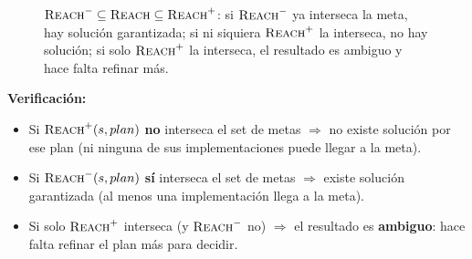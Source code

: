 \begin{figure}[H]
\centering
{}
\caption{$\textsc{Reach}^-\subseteq\textsc{Reach}\subseteq\textsc{Reach}^+$: si $\textsc{Reach}^-$ ya
interseca la meta, hay solución garantizada; si ni siquiera $\textsc{Reach}^+$ la interseca, no hay
solución; si solo $\textsc{Reach}^+$ la interseca, el resultado es ambiguo y hace falta refinar más.}
\end{figure}

\textbf{Verificación:}
\begin{itemize}
    \item Si $\textsc{Reach}^+(s,plan)$ \textbf{no} interseca el set de metas $\Rightarrow$ no existe
    solución por ese plan (ni ninguna de sus implementaciones puede llegar a la meta).
    \item Si $\textsc{Reach}^-(s,plan)$ \textbf{sí} interseca el set de metas $\Rightarrow$ existe
    solución garantizada (al menos una implementación llega a la meta).
    \item Si solo $\textsc{Reach}^+$ interseca (y $\textsc{Reach}^-$ no) $\Rightarrow$ el resultado es
    \textbf{ambiguo}: hace falta refinar el plan más para decidir.
\end{itemize}

